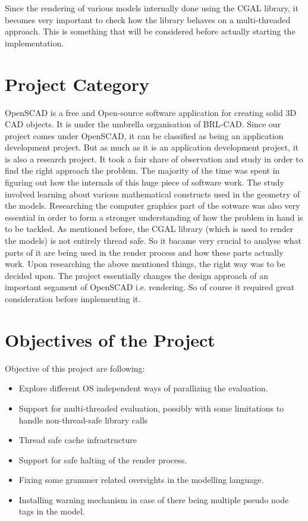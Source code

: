 Since the rendering of various models internally done using the CGAL library, it becomes very important to check how the library behaves on a multi-threaded approach. This is something that will be considered before actually starting the implementation.



\section{Project Category}
OpenSCAD is a free and Open-source software application for creating solid 3D CAD objects. It is under the umbrella organisation of BRL-CAD. Since our project comes under OpenSCAD, it can be classified as being an application development project. But as much as it is an application development project, it is also a research project. It took a fair share of observation and study in order to find the right approach the problem. The majority of the time was spent in figuring out how the internals of this huge piece of software work. The study involved learning about various mathematical constructs used in the geometry of the models. Researching the computer graphics part of the sotware was also very essential in order to form a stronger understanding of how the problem in hand is to be tackled. As mentioned before, the CGAL library (which is used to render the models) is not entirely thread safe. So it bacame very crucial to analyse what parts of it are being used in the render process and how these parts actually work.
Upon researching the above mentioned things, the right way was to be decided upon. The project essentially changes the design approach of an important segament of OpenSCAD i.e. rendering. So of course it required great consideration before implementing it.


\section{Objectives of the Project}
Objective of this project are following:
\begin{itemize}
\item Explore different OS independent ways of parallizing the evaluation.
\item Support for multi-threaded evaluation, possibly with some limitations to handle non-thread-safe library calls
\item Thread safe cache infrastructure
\item Support for safe halting of the render process.
\item Fixing some grammer related oversights in the modelling language.
\item Installing warning mechanism in case of there being multiple pseudo node tags in the model.
\end{itemize}


